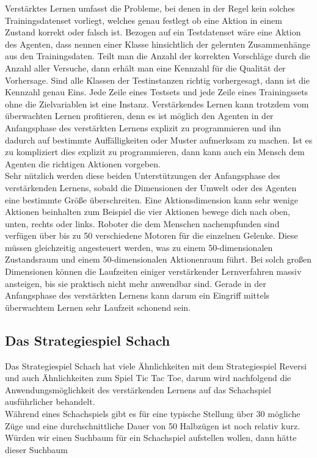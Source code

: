 Verstärktes Lernen umfasst die Probleme, bei denen in der Regel kein solches Trainingsdatenset vorliegt, welches genau festlegt ob eine Aktion in einem Zustand korrekt oder falsch ist. Bezogen auf ein Testdatenset wäre eine Aktion des Agenten, dass nennen einer Klasse hinsichtlich der gelernten Zusammenhänge aus den Trainingsdaten. Teilt man die Anzahl der korrekten Vorschläge durch die Anzahl aller Versuche, dann erhält man eine Kennzahl für die Qualität der Vorhersage. Sind alle Klassen der Testinstanzen richtig vorhergesagt, dann ist die Kennzahl genau Eins. Jede Zeile eines Testsets und jede Zeile eines Trainingssets ohne die Zielvariablen ist eine Instanz. Verstärkendes Lernen kann trotzdem vom überwachten Lernen profitieren, denn es ist möglich den Agenten in der Anfangsphase des verstärkten Lernens explizit zu programmieren und ihn dadurch auf bestimmte Auffälligkeiten oder Muster aufmerksam zu machen. Ist es zu kompliziert dies explizit zu programmieren, dann kann auch ein Mensch dem Agenten die richtigen Aktionen vorgeben. \\

Sehr nützlich werden diese beiden Unterstützungen der Anfangsphase des verstärkenden Lernens, sobald die Dimensionen der Umwelt oder des Agenten eine bestimmte Größe überschreiten. Eine Aktionsdimension kann sehr wenige Aktionen beinhalten zum Beispiel die vier Aktionen bewege dich nach oben, unten, rechts oder links. Roboter die dem Menschen nachempfunden sind verfügen über bis zu 50 verschiedene Motoren für die einzelnen Gelenke. Diese müssen gleichzeitig angesteuert werden, was zu einem 50-dimensionalen Zustandsraum und einem 50-dimensionalen Aktionenraum führt\cite[\acs{vgl.} 305\psq]{Ertel}. Bei solch großen Dimensionen können die Laufzeiten einiger verstärkender Lernverfahren massiv ansteigen, bis sie praktisch nicht mehr anwendbar sind. Gerade in der Anfangsphase des verstärkten Lernens kann darum ein Eingriff mittels überwachtem Lernen sehr Laufzeit schonend sein.

\subsection{Das Strategiespiel Schach}
Das Strategiespiel Schach hat viele Ähnlichkeiten mit dem Strategiespiel Reversi und auch Ähnlichkeiten zum Spiel Tic Tac Toe, darum wird nachfolgend die  Anwendungsmöglichkeit des verstärkenden Lernens auf das Schachspiel ausführlicher behandelt. \\

Während eines Schachspiels gibt es für eine typische Stellung über 30 mögliche Züge und eine durchschnittliche Dauer von 50 Halbzügen ist noch relativ kurz. Würden wir einen Suchbaum  für ein Schachspiel aufstellen wollen, dann hätte dieser Suchbaum

